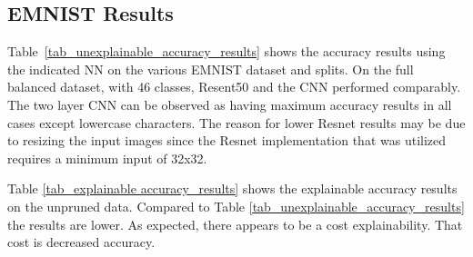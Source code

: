 \documentclass[conference]{IEEEtran}
\begin{document}

\subsection{EMNIST Results}
\label{emnist_results}

Table~\ref{tab_unexplainable_accuracy_results} shows the accuracy results using
the indicated NN on the various EMNIST dataset and splits. On the full balanced
dataset, with 46 classes, Resent50 and the CNN performed comparably. The two
layer CNN can be observed as having maximum accuracy results in all cases except
lowercase characters.  The reason for lower Resnet results may be due to
resizing the input images since the Resnet implementation that was utilized
requires a minimum input of 32x32.  

\begin{table}
    \centering
    \caption{Unexplainable accuracy results on various balanced EMNIST data sets with differing NN models}
    \label{tab_unexplainable_accuracy_results}
\end{table}

Table \ref{tab_explainable accuracy_results} shows the explainable accuracy
results on the unpruned data. Compared to Table
\ref{tab_unexplainable_accuracy_results} the results are lower.  As expected,
there appears to be a cost explainability.  That cost is decreased accuracy.
\end{document}
